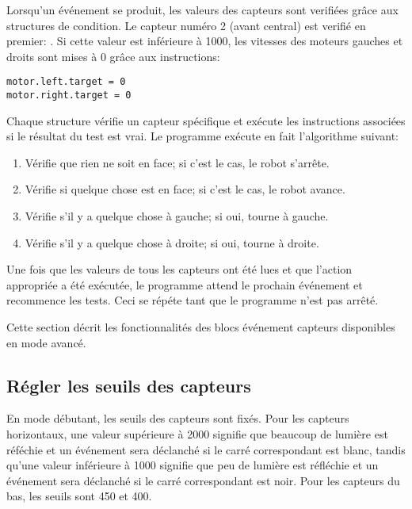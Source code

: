 Lorsqu'un événement se produit, les valeurs des capteurs sont verifiées grâce aux structures de condition.
Le capteur numéro 2 (avant central) est verifié en premier: .
Si cette valeur est inférieure à 1000, les vitesses des moteurs gauches et droits sont mises à 0
grâce aux instructions:

\begin{footnotesize}
\begin{verbatim}
motor.left.target = 0
motor.right.target = 0
\end{verbatim}
\end{footnotesize}

Chaque structure  vérifie un capteur spécifique et exécute les instructions
associées si le résultat du test est vrai.
Le programme exécute en fait l'algorithme suivant:

\begin{enumerate}[start=0,noitemsep,nosep]
\item Vérifie que rien ne soit en face; si c'est le cas, le robot s'arrête.
\item Vérifie si quelque chose est en face; si c'est le cas, le robot avance.
\item Vérifie s'il y a quelque chose à gauche; si oui, tourne à gauche.
\item Vérifie s'il y a quelque chose à droite; si oui, tourne à droite.
\end{enumerate}

Une fois que les valeurs de tous les capteurs ont été lues et que l'action appropriée a été exécutée,
le programme attend le prochain événement  et recommence les tests.
Ceci se répéte tant que le programme n'est pas arrêté.





Cette section décrit les fonctionnalités des blocs événement capteurs disponibles en mode avancé.

\subsection*{Régler les seuils des capteurs}

En mode débutant, les seuils des capteurs sont fixés.
Pour les capteurs horizontaux, une valeur supérieure à 2000 signifie que beaucoup de lumière
est réféchie et un événement sera déclanché si le carré correspondant est blanc,
tandis qu'une valeur inférieure à 1000 signifie que peu de lumière est réfléchie 
et un événement sera déclanché si le carré correspondant est noir.
Pour les capteurs du bas, les seuils sont 450 et 400.

